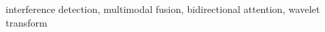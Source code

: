 \documentclass[conference]{IEEEtran}
\begin{document}
\begin{abstract}

\end{abstract}

\begin{IEEEkeywords}
    interference detection, multimodal fusion, bidirectional attention, wavelet transform
\end{IEEEkeywords}


\end{document}
